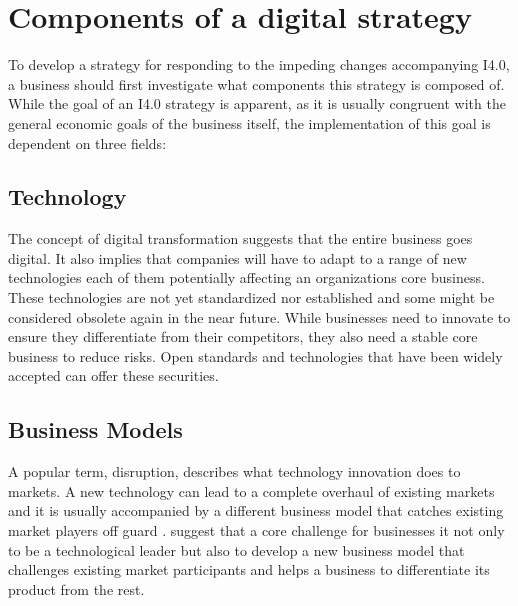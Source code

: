 \section{Components of a digital strategy}
To develop a strategy for responding to the impeding changes accompanying \ac{I4.0}, a business should first investigate what components this strategy is composed of. While the goal of an \ac{I4.0} strategy is apparent, as it is usually congruent with the general economic goals of the business itself, the implementation of this goal is dependent on three fields:


\subsection{Technology}
The concept of digital transformation suggests that the entire business goes digital. It also implies that companies will have to adapt to a range of new technologies %
 each of them potentially affecting an organizations core business. These technologies are not yet standardized nor established and some might be considered obsolete again in the near future. While businesses need to innovate to ensure they differentiate from their competitors, %
 they also need a stable core business to reduce risks. Open standards and technologies that have been widely accepted can offer these securities.



\subsection{Business Models}
A popular term, disruption, describes what technology innovation does to markets. A new technology can lead to a complete overhaul of existing markets and it is usually accompanied by a different business model that catches existing market players off guard \cite{LucasJr200946}. \citeauthor{gassmann2013geschaeftsmodelle} suggest that a core challenge for businesses it not only to be a technological leader but also to develop a new business model that challenges existing market participants and helps a business to differentiate its product from the rest. 

